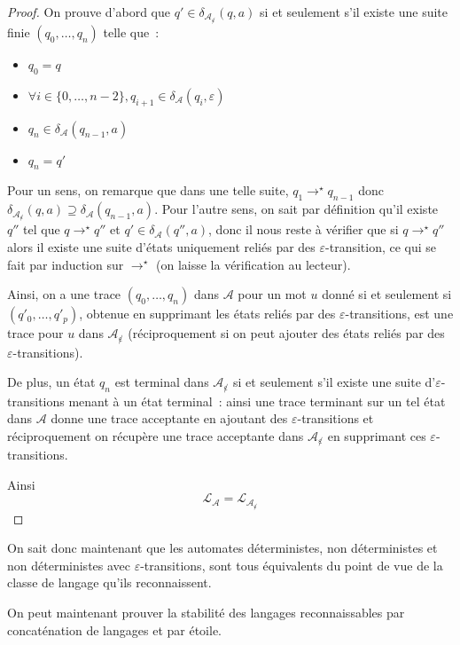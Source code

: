 \begin{proof}
  On prouve d'abord que $q'\in \delta_{\mathcal A_{\not\varepsilon}}(q,a)$ si et
  seulement s'il existe une suite finie $(q_0,\ldots,q_n)$ telle que~:
  \begin{itemize}
  \item $q_0 = q$
  \item $\forall i \in \{0,\ldots,n-2\}, q_{i+1} \in
    \delta_{\mathcal A}(q_i,\varepsilon)$
  \item $q_n \in \delta_{\mathcal A}(q_{n-1},a)$
  \item $q_n = q'$
  \end{itemize}
  Pour un sens, on remarque que dans une telle suite, $q_1 \to^\star q_{n-1}$
  donc $\delta_{\mathcal A_{\not\varepsilon}}(q,a)\supseteq \delta_\mathcal A(q_{n-1},a)$.
  Pour l'autre sens, on sait par définition qu'il existe $q''$ tel que
  $q\to^\star q''$ et $q'\in\delta_\mathcal A (q'',a)$, donc il nous reste à
  vérifier que si $q\to^\star q''$ alors il existe une suite d'états uniquement
  reliés par des $\varepsilon$-transition, ce qui se fait par induction sur
  $\to^\star$ (on laisse la vérification au lecteur).

  Ainsi, on a une trace $(q_0,\ldots,q_n)$ dans $\mathcal A$ pour un mot $u$
  donné si et seulement si $(q'_0,\ldots,q'_p)$, obtenue en supprimant les
  états reliés par des $\varepsilon$-transitions, est une trace pour $u$ dans
  $\mathcal A_{\not\varepsilon}$ (réciproquement si on peut ajouter des états
  reliés par des $\varepsilon$-transitions).

  De plus, un état $q_n$ est terminal dans $\mathcal A_{\not\varepsilon}$ si et
  seulement s'il existe une suite d'$\varepsilon$-transitions menant à un état
  terminal~: ainsi une trace terminant sur un tel état dans $\mathcal A$ donne
  une trace acceptante en ajoutant des $\varepsilon$-transitions et
  réciproquement on récupère une trace acceptante dans
  $\mathcal A_{\not\varepsilon}$ en supprimant ces $\varepsilon$-transitions.

  Ainsi
  \[\mathcal L_{\mathcal A} = \mathcal L_{\mathcal A_{\not\varepsilon}}\]
\end{proof}

On sait donc maintenant que les automates déterministes, non déterministes et
non déterministes avec $\varepsilon$-transitions, sont tous équivalents du
point de vue de la classe de langage qu'ils reconnaissent.

On peut maintenant prouver la stabilité des langages reconnaissables par
concaténation de langages et par étoile.

